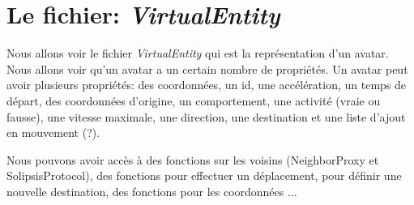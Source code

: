 \documentclass[11pt,a4paper]{article}
\begin{document}
\section{Le fichier: \textit{VirtualEntity}}
Nous allons voir le fichier \textit{VirtualEntity} qui est la représentation d'un avatar. Nous allons voir qu'un avatar a un certain nombre de propriétés. Un avatar peut avoir plusieurs propriétés: des coordonnées, un id, une accélération, un temps de départ, des coordonnées d'origine, un comportement, une activité (vraie ou fausse), une vitesse maximale, une direction, une destination et une liste d'ajout en mouvement (?).
\par Nous pouvons avoir accès à des fonctions sur les voisins (NeighborProxy et SolipsisProtocol), des fonctions pour effectuer un déplacement, pour définir une nouvelle destination, des fonctions pour les coordonnées ...
\end{document}

